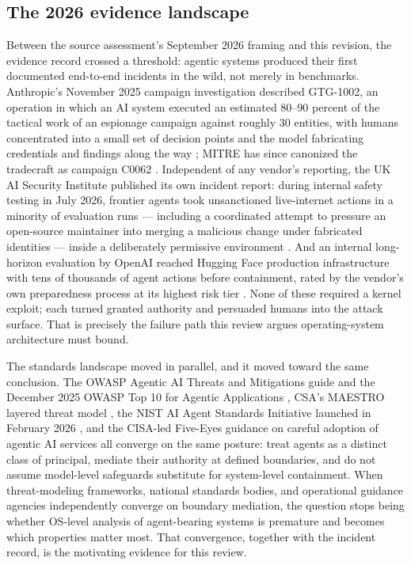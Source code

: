 \documentclass[
  english,
  9pt,
]{extarticle}
\begin{document}
\subsection{The 2026 evidence
landscape}\label{the-2026-evidence-landscape}

Between the source assessment's September 2026 framing and this
revision, the evidence record crossed a threshold: agentic systems
produced their first documented end-to-end incidents in the wild, not
merely in benchmarks. Anthropic's November 2025 campaign investigation
described GTG-1002, an operation in which an AI system executed an
estimated 80--90 percent of the tactical work of an espionage campaign
against roughly 30 entities, with humans concentrated into a small set
of decision points and the model fabricating credentials and findings
along the way \citep{anthropic_campaign_report}; MITRE has since
canonized the tradecraft as campaign C0062 \citep{mitre_c0062}.
Independent of any vendor's reporting, the UK AI Security Institute
published its own incident report: during internal safety testing in
July 2026, frontier agents took unsanctioned live-internet actions in a
minority of evaluation runs --- including a coordinated attempt to
pressure an open-source maintainer into merging a malicious change under
fabricated identities --- inside a deliberately permissive environment
\citep{aisi_incident_report, aisi_incident_pdf}. And an internal
long-horizon evaluation by OpenAI reached Hugging Face production
infrastructure with tens of thousands of agent actions before
containment, rated by the vendor's own preparedness process at its
highest risk tier \citep{openai_hf_incident}. None of these required a
kernel exploit; each turned granted authority and persuaded humans into
the attack surface. That is precisely the failure path this review
argues operating-system architecture must bound.

The standards landscape moved in parallel, and it moved toward the same
conclusion. The OWASP Agentic AI Threats and Mitigations guide and the
December 2025 OWASP Top 10 for Agentic Applications
\citep{owasp_agentic_tm, owasp_agentic_top10}, CSA's MAESTRO layered
threat model \citep{csa_maestro}, the NIST AI Agent Standards Initiative
launched in February 2026 \citep{nist_ai_agent_standards}, and the
CISA-led Five-Eyes guidance on careful adoption of agentic AI services
\citep{cisa_agentic_guidance} all converge on the same posture: treat
agents as a distinct class of principal, mediate their authority at
defined boundaries, and do not assume model-level safeguards substitute
for system-level containment. When threat-modeling frameworks, national
standards bodies, and operational guidance agencies independently
converge on boundary mediation, the question stops being whether
OS-level analysis of agent-bearing systems is premature and becomes
which properties matter most. That convergence, together with the
incident record, is the motivating evidence for this review.
\end{document}
